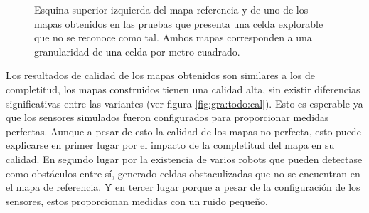 \begin{figure}[H]
  \centerfloat

  \qquad

  \caption[Celda explorable que no se reconoce como tal.]{Esquina superior izquierda del mapa referencia y de uno de los mapas
  obtenidos en las pruebas que presenta una celda explorable que no se reconoce
como tal. Ambos mapas corresponden a una granularidad de una celda por metro cuadrado.}\label{fig:faltaCub}

\end{figure}

Los resultados de calidad de los mapas obtenidos son similares a los de
completitud, los mapas construidos tienen una calidad alta, sin existir
diferencias significativas entre las variantes (ver figura \ref{fig:gra:todo:cal}). Esto es esperable ya que
los sensores simulados fueron configurados para proporcionar medidas perfectas.
Aunque a pesar de esto la calidad de los mapas no perfecta, esto puede explicarse en primer
lugar por el impacto de la completitud del mapa en su calidad. En segundo lugar
por la existencia de varios robots que pueden detectase como obstáculos entre
sí, generado celdas obstaculizadas que no se encuentran en el mapa de
referencia. Y en tercer lugar porque a pesar de la configuración de los
sensores, estos proporcionan medidas con un ruido pequeño.

